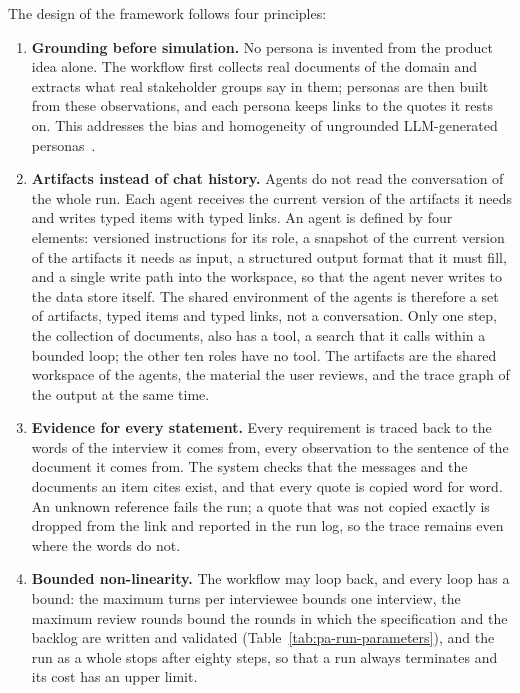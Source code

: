 The design of the framework follows four principles:
\begin{enumerate}
    \item \textbf{Grounding before simulation.} No persona is invented from the product idea alone. The workflow first collects real documents of the domain and extracts what real stakeholder groups say in them; personas are then built from these observations, and each persona keeps links to the quotes it rests on. This addresses the bias and homogeneity of ungrounded LLM-generated personas~\cite{li2026persona}.
    \item \textbf{Artifacts instead of chat history.} Agents do not read the conversation of the whole run. Each agent receives the current version of the artifacts it needs and writes typed items with typed links. An agent is defined by four elements: versioned instructions for its role, a snapshot of the current version of the artifacts it needs as input, a structured output format that it must fill, and a single write path into the workspace, so that the agent never writes to the data store itself. The shared environment of the agents is therefore a set of artifacts, typed items and typed links, not a conversation. Only one step, the collection of documents, also has a tool, a search that it calls within a bounded loop; the other ten roles have no tool. The artifacts are the shared workspace of the agents, the material the user reviews, and the trace graph of the output at the same time.
    \item \textbf{Evidence for every statement.} Every requirement is traced back to the words of the interview it comes from, every observation to the sentence of the document it comes from. The system checks that the messages and the documents an item cites exist, and that every quote is copied word for word. An unknown reference fails the run; a quote that was not copied exactly is dropped from the link and reported in the run log, so the trace remains even where the words do not.
    \item \textbf{Bounded non-linearity.} The workflow may loop back, and every loop has a bound: the maximum turns per interviewee bounds one interview, the maximum review rounds bound the rounds in which the specification and the backlog are written and validated (Table~\ref{tab:pa-run-parameters}), and the run as a whole stops after eighty steps, so that a run always terminates and its cost has an upper limit.
\end{enumerate}

